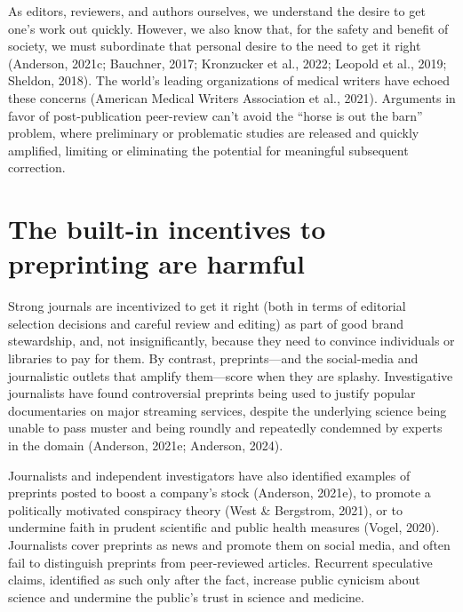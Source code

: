 \documentclass[authordate, perspective]{jote-new-article}
\begin{document}
	As editors, reviewers, and authors ourselves, we understand the desire to get one's work out quickly. However, we also know that, for the safety and benefit of society, we must subordinate that personal desire to the need to get it right (Anderson, 2021c; Bauchner, 2017; Kronzucker et al., 2022; Leopold et al., 2019; Sheldon, 2018). The world's leading organizations of medical writers have echoed these concerns (American Medical Writers Association et al., 2021). Arguments in favor of post-publication peer-review can't avoid the “horse is out the barn” problem, where preliminary or problematic studies are released and quickly amplified, limiting or eliminating the potential for meaningful subsequent correction.







	\section{The built-in incentives to preprinting are harmful}







	Strong journals are incentivized to get it right (both in terms of editorial selection decisions and careful review and editing) as part of good brand stewardship, and, not insignificantly, because they need to convince individuals or libraries to pay for them. By contrast, preprints—and the social-media and journalistic outlets that amplify them—score when they are splashy. Investigative journalists have found controversial preprints being used to justify popular documentaries on major streaming services, despite the underlying science being unable to pass muster and being roundly and repeatedly condemned by experts in the domain (Anderson, 2021e; Anderson, 2024).







	Journalists and independent investigators have also identified examples of preprints posted to boost a company's stock (Anderson, 2021e), to promote a politically motivated conspiracy theory (West \& Bergstrom, 2021), or to undermine faith in prudent scientific and public health measures (Vogel, 2020). Journalists cover preprints as news and promote them on social media, and often fail to distinguish preprints from peer-reviewed articles. Recurrent speculative claims, identified as such only after the fact, increase public cynicism about science and undermine the public's trust in science and medicine.
\end{document}
